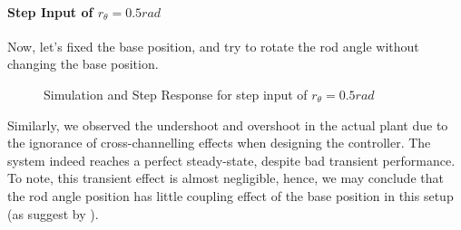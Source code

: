 \documentclass{tron}
\begin{document}
\paragraph{Step Input of $r_{\theta}=0.5\unit{rad}$}
Now, let's fixed the base position, and try to rotate the rod angle without changing the base position.
\begin{figure}[H]
	\centering
	 \quad
	\caption{Simulation and Step Response for step input of $r_{\theta}=0.5\unit{rad}$}
	\label{fig:p5:P3_aug:sim:fixe-w}
\end{figure}
Similarly, we observed the undershoot and overshoot in the actual plant due to the ignorance of cross-channelling effects when designing the controller. The system indeed reaches a perfect steady-state, despite bad transient performance. To note, this transient effect is almost negligible, hence, we may conclude that the rod angle position has little coupling effect of the base position in this setup (as suggest by ).
\end{document}
